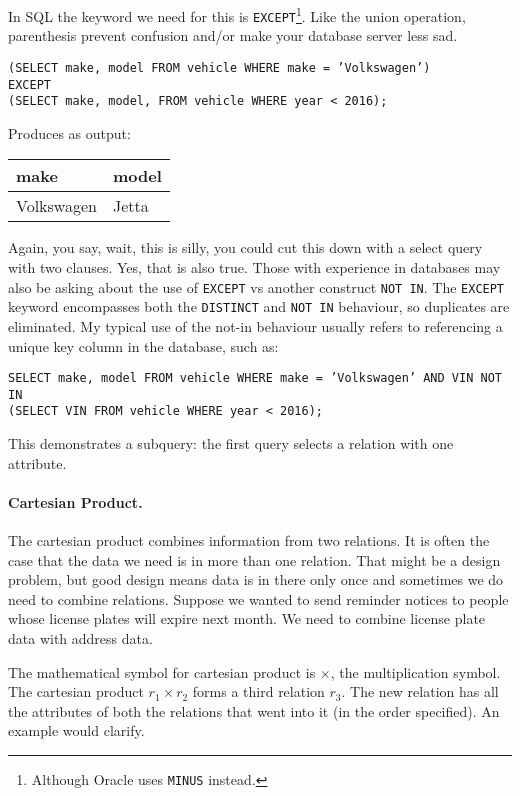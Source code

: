 In SQL the keyword we need for this is \texttt{EXCEPT}\footnote{Although Oracle uses \texttt{MINUS} instead.}. Like the union operation, parenthesis prevent confusion and/or make your database server less sad.

\texttt{(SELECT make, model FROM vehicle WHERE make = 'Volkswagen')\\
EXCEPT\\
(SELECT make, model, FROM vehicle WHERE year < 2016);}

Produces as output: 

\begin{center}
\begin{tabular}{|l|l|} \hline
\textbf{make} & \textbf{model} \\ \hline
	Volkswagen & Jetta  \\ \hline
\end{tabular}
\end{center}

Again, you say, wait, this is silly, you could cut this down with a select query with two clauses. Yes, that is also true. Those with experience in databases may also be asking about the use of \texttt{EXCEPT} vs another construct \texttt{NOT IN}. The \texttt{EXCEPT} keyword encompasses both the \texttt{DISTINCT} and \texttt{NOT IN} behaviour, so duplicates are eliminated. My typical use of the not-in behaviour usually refers to referencing a unique key column in the database, such as:

\texttt{SELECT make, model FROM vehicle WHERE make = 'Volkswagen' AND 
VIN NOT IN\\ (SELECT VIN FROM vehicle WHERE year < 2016);}

This demonstrates a subquery: the first query selects a relation with one attribute.  

\paragraph{Cartesian Product.} The cartesian product combines information from two relations. It is often the case that the data we need is in more than one relation. That might be a design problem, but good design means data is in there only once and sometimes we do need to combine relations. Suppose we wanted to send reminder notices to people whose license plates will expire next month. We need to combine license plate data with address data. 

The mathematical symbol for cartesian product is $\times$, the multiplication symbol. The cartesian product $r_{1} \times r_{2}$ forms a third relation $r_{3}$. The new relation has all the attributes of both the relations that went into it (in the order specified). An example would clarify.

